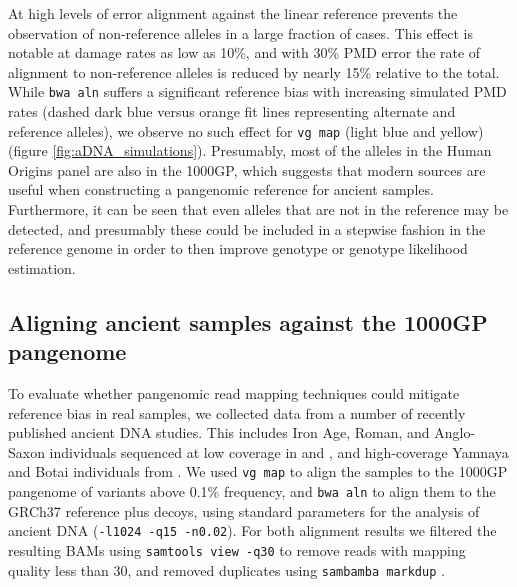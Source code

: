 At high levels of error alignment against the linear reference prevents the observation of non-reference alleles in a large fraction of cases.
This effect is notable at damage rates as low as 10\%, and with 30\% PMD error the rate of alignment to non-reference alleles is reduced by nearly 15\% relative to the total.
While {\tt bwa aln} suffers a significant reference bias with increasing simulated PMD rates (dashed dark blue versus orange fit lines representing alternate and reference alleles), we observe no such effect for {\tt vg map} (light blue and yellow) (figure \ref{fig:aDNA_simulations}).
Presumably, most of the alleles in the Human Origins panel are also in the 1000GP, which suggests that modern sources are useful when constructing a pangenomic reference for ancient samples.
Furthermore, it can be seen that even alleles that are not in the reference may be detected, and presumably these could be included in a stepwise fashion in the reference genome in order to then improve genotype or genotype likelihood estimation.

\subsection{Aligning ancient samples against the 1000GP pangenome}

To evaluate whether pangenomic read mapping techniques could mitigate reference bias in real samples, we collected data from a number of recently published ancient DNA studies.
This includes Iron Age, Roman, and Anglo-Saxon individuals sequenced at low coverage in \cite{schiffels2016iron} and \cite{martiniano2016genomic}, and high-coverage Yamnaya and Botai individuals from \cite{de2018first}.
We used {\tt vg map} to align the samples to the 1000GP pangenome of variants above 0.1\% frequency, and {\tt bwa aln} to align them to the GRCh37 reference plus decoys, using standard parameters for the analysis of ancient DNA ({\tt -l1024 -q15 -n0.02}).
For both alignment results we filtered the resulting BAMs using {\tt samtools view -q30} to remove reads with mapping quality less than 30, and removed duplicates using {\tt sambamba markdup} \cite{tarasov2015sambamba}.

